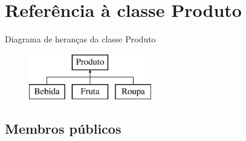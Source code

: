 \hypertarget{classProduto}{\section{Referência à classe Produto}
\label{classProduto}
}
Diagrama de heranças da classe Produto\begin{figure}[H]
\begin{center}
\leavevmode
\includegraphics[height=2.000000cm]{d8/d30/classProduto}
\end{center}
\end{figure}
\subsection*{Membros públicos}
